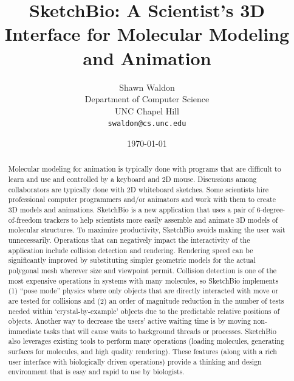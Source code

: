 \documentclass{article} %
\begin{document}
\title{SketchBio: A Scientist's 3D Interface for Molecular Modeling and Animation}
\author{Shawn Waldon\\Department of Computer Science\\
			UNC Chapel Hill\\\texttt{swaldon@cs.unc.edu}}
\date{\today}
\maketitle

\begin{abstract}
Molecular modeling for animation is typically done with programs that are difficult to learn and use and controlled by a keyboard and 2D mouse.  Discussions among collaborators are typically done with 2D whiteboard sketches.  Some scientists hire professional computer programmers and/or animators and work with them to create 3D models and animations.  SketchBio is a new application that uses a pair of 6-degree-of-freedom trackers to help scientists more easily assemble and animate 3D models of molecular structures.  To maximize productivity, SketchBio avoids making the user wait unnecessarily.  Operations that can negatively impact the interactivity of the application include collision detection and rendering.  Rendering speed can be significantly improved by substituting simpler geometric models for the actual polygonal mesh wherever size and viewpoint permit.  Collision detection is one of the most expensive operations in systems with many molecules, so SketchBio implements (1) “pose mode” physics where only objects that are directly interacted with move or are tested for collisions and (2) an order of magnitude reduction in the number of tests needed within ‘crystal-by-example' objects due to the predictable relative positions of objects.  Another way to decrease the users' active waiting time is by moving non-immediate tasks that will cause waits to background threads or processes.  SketchBio also leverages existing tools to perform many operations (loading molecules, generating surfaces for molecules, and high quality rendering).  These features (along with a rich user interface with biologically driven operations) provide a thinking and design environment that is easy and rapid to use by biologists.

\end{abstract}
\end{document}
